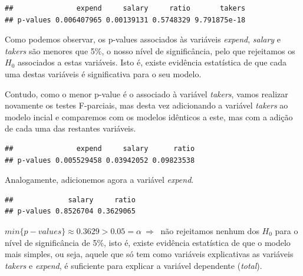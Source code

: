 \documentclass[]{article}
\begin{document}
\begin{verbatim}
##               expend     salary     ratio       takers
## p-values 0.006407965 0.00139131 0.5748329 9.791875e-18
\end{verbatim}

Como podemos observar, os p-values associados às variáveis
\emph{expend}, \emph{salary} e \emph{takers} são menores que 5\%, o
nosso nível de significância, pelo que rejeitamos os \(H_0\) associados
a estas variáveis. Isto é, existe evidência estatística de que cada uma
destas variáveis é significativa para o seu modelo.

Contudo, como o menor p-value é o associado à variável \emph{takers},
vamos realizar novamente os testes F-parciais, mas desta vez adicionando
a variável \emph{takers} ao modelo incial e comparemos com os modelos
idênticos a este, mas com a adição de cada uma das restantes variáveis.

\begin{Shaded}
\begin{Highlighting}[]
\NormalTok{(}\NormalTok{, }\NormalTok{(}\NormalTok{, }\NormalTok{, }\NormalTok{))}
\end{Highlighting}
\end{Shaded}

\begin{verbatim}
##               expend     salary      ratio
## p-values 0.005529458 0.03942052 0.09823538
\end{verbatim}

Analogamente, adicionemos agora a variável \emph{expend}.

\begin{Shaded}
\begin{Highlighting}[]
\NormalTok{(}\NormalTok{, }\NormalTok{(}\NormalTok{, }\NormalTok{))}
\end{Highlighting}
\end{Shaded}

\begin{verbatim}
##             salary     ratio
## p-values 0.8526704 0.3629065
\end{verbatim}

\(min\{p-values\} \approx 0.3629 > 0.05 = \alpha\ \Rightarrow\ \) não
rejeitamos nenhum dos \(H_0\) para o nível de significância de 5\%, isto
é, existe evidência estatística de que o modelo mais simples, ou seja,
aquele que só tem como variáveis explicativas as variáveis \emph{takers}
e \emph{expend}, é suficiente para explicar a variável dependente
(\emph{total}).
\end{document}
